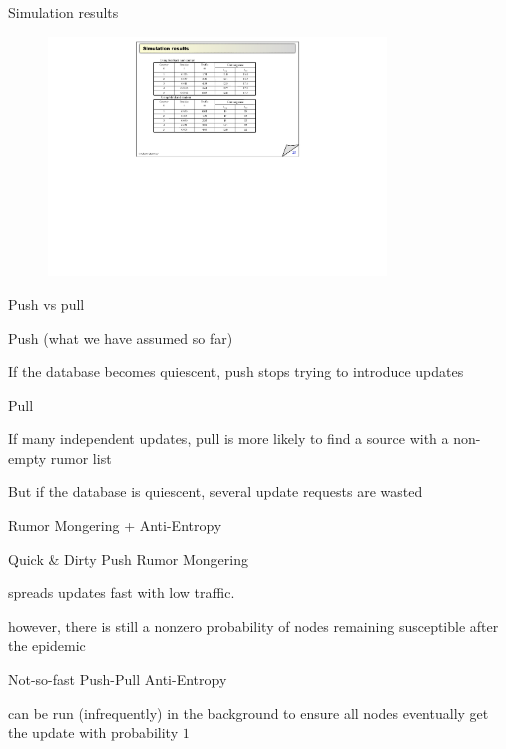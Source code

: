 \begin{frame}{Simulation results}
	
\begin{figure}
	\includegraphics[width=0.8\textwidth]{figs/05/simulation}	
\end{figure}

\end{frame}

\begin{frame}{Push vs pull}
	
\BIL
\item Push (what we have assumed so far)
\BI
\item If the database becomes quiescent, push stops trying to introduce updates
\EI
\item Pull
\BI
\item If many independent updates, pull is more likely to find a source with a non-empty rumor list
\item But if the database is quiescent, several update requests are wasted
\EI
\EIL

\end{frame}

\begin{frame}{Rumor Mongering + Anti-Entropy}

\BIL
\item Quick \& Dirty Push Rumor Mongering 
\BI
\item spreads updates fast with low traffic.
\item however, there is still a nonzero probability of nodes remaining susceptible after the epidemic
\EI
\item Not-so-fast Push-Pull Anti-Entropy
\BI
\item can be run (infrequently) in the background to ensure all nodes eventually get the update with probability $1$
\EI
\EIL

\end{frame}

